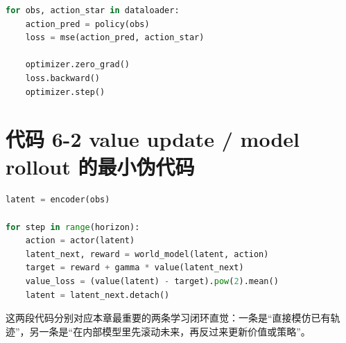 \begin{lstlisting}[language=python]
for obs, action_star in dataloader:
    action_pred = policy(obs)
    loss = mse(action_pred, action_star)

    optimizer.zero_grad()
    loss.backward()
    optimizer.step()
\end{lstlisting}

\section*{代码 6-2 value update / model rollout 的最小伪代码}

\begin{lstlisting}[language=python]
latent = encoder(obs)

for step in range(horizon):
    action = actor(latent)
    latent_next, reward = world_model(latent, action)
    target = reward + gamma * value(latent_next)
    value_loss = (value(latent) - target).pow(2).mean()
    latent = latent_next.detach()
\end{lstlisting}

这两段代码分别对应本章最重要的两条学习闭环直觉：一条是“直接模仿已有轨迹”，另一条是“在内部模型里先滚动未来，再反过来更新价值或策略”。
